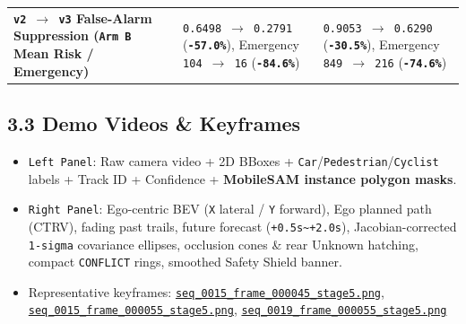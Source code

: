 \documentclass[10.5pt,a4paper]{article}
\begin{document}
\begin{footnotesize}
\begin{longtable}{>{\raggedright\arraybackslash}p{} >{\raggedright\arraybackslash}p{} >{\raggedright\arraybackslash}p{}}
\textbf{\texttt{v2 $\rightarrow$ v3} False-Alarm Suppression (\texttt{Arm B} Mean Risk / Emergency)} & \texttt{0.\allowbreak{}6498 $\rightarrow$ 0.\allowbreak{}2791} (\textbf{\texttt{-\allowbreak{}57.\allowbreak{}0\%}}), Emergency \texttt{104 $\rightarrow$ 16} (\textbf{\texttt{-\allowbreak{}84.\allowbreak{}6\%}}) & \texttt{0.\allowbreak{}9053 $\rightarrow$ 0.\allowbreak{}6290} (\textbf{\texttt{-\allowbreak{}30.\allowbreak{}5\%}}), Emergency \texttt{849 $\rightarrow$ 216} (\textbf{\texttt{-\allowbreak{}74.\allowbreak{}6\%}}) \\
\end{longtable}
\end{footnotesize}


\subsection{3.3 Demo Videos \& Keyframes}
\begin{itemize}[leftmargin=1.5em,itemsep=2pt]
\item \texttt{Left Panel}: Raw camera video + 2D BBoxes + \texttt{Car}/\texttt{Pedestrian}/\texttt{Cyclist} labels + Track ID + Confidence + \textbf{MobileSAM instance polygon masks}.
\item \texttt{Right Panel}: Ego-centric BEV (\texttt{X} lateral / \texttt{Y} forward), Ego planned path (CTRV), fading past trails, future forecast (\texttt{+0.\allowbreak{}5s\textasciitilde{}+2.\allowbreak{}0s}), Jacobian-corrected \texttt{1-\allowbreak{}sigma} covariance ellipses, occlusion cones \& rear Unknown hatching, compact \texttt{CONFLICT} rings, smoothed Safety Shield banner.
\item Representative keyframes: \href{https://github.com/Heisnotanimposter/Totalcare\_autonomous\_driving\_Yolov5/blob/main/results/v3\_bev\_fixed/world\_outputs/world\_model\_0015\_staged/keyframes/seq\_0015\_frame\_000045\_stage5.png}{\texttt{seq\_\allowbreak{}0015\_\allowbreak{}frame\_\allowbreak{}000045\_\allowbreak{}stage5.\allowbreak{}png}}, \href{https://github.com/Heisnotanimposter/Totalcare\_autonomous\_driving\_Yolov5/blob/main/results/v3\_bev\_fixed/world\_outputs/world\_model\_0015\_staged/keyframes/seq\_0015\_frame\_000055\_stage5.png}{\texttt{seq\_\allowbreak{}0015\_\allowbreak{}frame\_\allowbreak{}000055\_\allowbreak{}stage5.\allowbreak{}png}}, \href{https://github.com/Heisnotanimposter/Totalcare\_autonomous\_driving\_Yolov5/blob/main/results/v3\_bev\_fixed/world\_outputs/world\_model\_0019\_staged/keyframes/seq\_0019\_frame\_000055\_stage5.png}{\texttt{seq\_\allowbreak{}0019\_\allowbreak{}frame\_\allowbreak{}000055\_\allowbreak{}stage5.\allowbreak{}png}}
\end{itemize}
\end{document}
